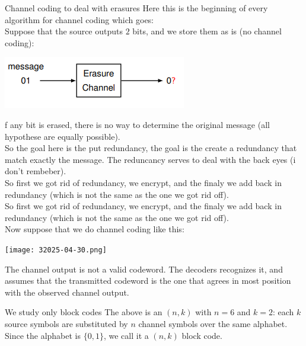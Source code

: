 \begin{parag}{Channel coding to deal with erasures}
    Here this is the beginning of every algorithm for channel coding which goes:\\
    Suppose that the source outputs $2$ bits, and we store them as is (no channel coding):
\begin{center}
    \includegraphics[scale=1.2]{22025-04-29.png}
    
\end{center}
f any bit is erased, there is no way to determine the original message (all hypothese are equally possible).\\
So the goal here is the put redundancy, the goal is the create a redundancy that match exactly the message. The reduncancy serves to deal with the back eyes (i don't rembeber).\\
So first we got rid of redundancy, we encrypt, and the finaly we add back in redundancy (which is not the same as the one we got rid off).
\\    
So first we got rid of redundancy, we encrypt, and the finaly we add back in redundancy (which is not the same as the one we got rid off).
\\
Now suppose that we do channel coding like this:
\begin{center}
    \texttt{[image: 32025-04-30.png]}
\end{center}
The channel output is not a valid codeword. The decoders recognizes it, and assumes that the transmitted codeword is the one that agrees in most position with the observed channel output.
\end{parag}
\begin{parag}{We study only block codes}
    The above is an $\left(n, k\right)$  with $n= 6$ and $k =  2$: each $k$ source symbols are substituted by $n$ channel symbols over the same alphabet.\\
    Since the alphabet is $\{0, 1\}$, we call it a  $\left(n, k\right)$ block code.
    
\end{parag}

